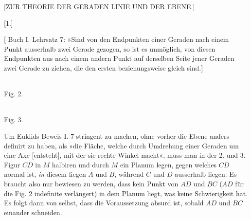 \clearpage
\begin{center}[ZUR THEORIE DER GERADEN LINIE UND DER EBENE.]\end{center}


\begin{center}[1.]\end{center}


[ Buch I. Lehrsatz 7: »Sind von den Endpunkten einer Geraden nach
einem Punkt ausserhalb zwei Gerade gezogen, so ist es unmöglich, von diesen
Endpunkten aus nach einem andern Punkt auf derselben Seite jener Geraden zwei
Gerade zu ziehen, die den ersten beziehungsweise gleich sind.]

\begin{center}
\begin{minipage}[b]{.42\linewidth}\centering\\[3pt]Fig. 2.\end{minipage}\hfill
\begin{minipage}[b]{.42\linewidth}\centering\\[3pt]Fig. 3.\end{minipage}
\end{center}
Um Euklids Beweis I. 7 stringent zu machen, ohne vorher die Ebene anders definirt
zu haben, als »die Fläche, welche durch Umdrehung einer Geraden um eine Axe
[entsteht], mit der sie rechte Winkel macht«, muss man in der 2. und 3. Figur $CD$
in $M$ halbiren und durch $M$ ein Planum legen, gegen welches $CD$ normal ist,
\emph{in} diesem liegen $A$ und $B$, während $C$ und $D$ ausserhalb liegen. Es
braucht also nur bewiesen zu werden, dass kein Punkt von $AD$ und $BC$ ($AD$ für
die Fig. 2 indefinite verlängert) in dem Planum liegt, was keine Schwierigkeit
hat. Es folgt dann von selbst, dass die Voraussetzung absurd ist, sobald $AD$ und
$BC$ einander schneiden.


